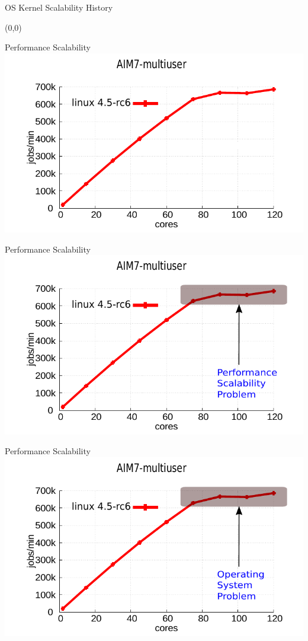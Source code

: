 \documentclass[english]{beamer} %
\begin{document}
\begin{frame}{OS Kernel Scalability History}
\begin{textblock}{1}(0,0)
\end{textblock}
\end{frame}


\begin{frame}{Performance Scalability}
\includegraphics[scale=0.8]{graph/aim7_default}
\end{frame}

\begin{frame}{Performance Scalability}
\includegraphics[scale=0.8]{graph/aim7_default_2}
\end{frame}

\begin{frame}{Performance Scalability}
\includegraphics[scale=0.8]{graph/aim7_default_3}
\end{frame}
\end{document}
